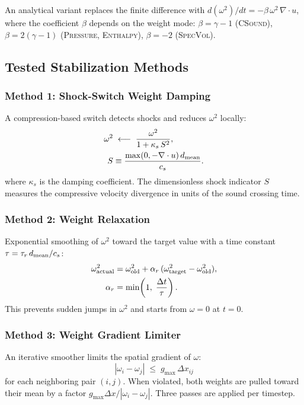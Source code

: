 \documentclass[twocolumn]{aastex63}
\newcommand{\vel}{{u}}
\begin{document}
An analytical variant replaces the finite difference with
$d(\omega^2)/dt = -\beta\,\omega^2\,\nabla\cdot\vel$, where the
coefficient $\beta$ depends on the weight mode:
$\beta = \gamma-1$ (\textsc{CSound}),
$\beta = 2(\gamma-1)$ (\textsc{Pressure}, \textsc{Enthalpy}),
$\beta = -2$ (\textsc{SpecVol}).

\subsection{Tested Stabilization Methods}

\subsubsection{Method 1: Shock-Switch Weight Damping}
A compression-based switch detects shocks and reduces $\omega^2$
locally:
\begin{equation}
  \begin{aligned}
  \omega^2 &\;\longleftarrow\; \frac{\omega^2}{1 + \kappa_s\, S^2},\\
  S &\equiv \frac{\max(0,-\nabla\cdot\vel)\,d_{\rm mean}}{c_s}.
  \end{aligned}
\end{equation}
where $\kappa_s$ is the damping coefficient.  The dimensionless
shock indicator $S$ measures the compressive velocity divergence
in units of the sound crossing time.

\subsubsection{Method 2: Weight Relaxation}
Exponential smoothing of $\omega^2$ toward the target value
with a time constant $\tau = \tau_r\, d_{\rm mean}/c_s$:
\begin{equation}
  \begin{aligned}
  \omega^{2}_{\rm actual} &= \omega^{2}_{\rm old}
    + \alpha_r\,(\omega^{2}_{\rm target} - \omega^{2}_{\rm old}),\\
  \alpha_r &= \min\!\left(1,\;\frac{\Delta t}{\tau}\right).
  \end{aligned}
\end{equation}
This prevents sudden jumps in $\omega^2$ and starts from
$\omega=0$ at $t=0$.

\subsubsection{Method 3: Weight Gradient Limiter}
An iterative smoother limits the spatial gradient of $\omega$:
\begin{equation}
  \left|\omega_i - \omega_j\right| \;\le\; g_{\max}\,\Delta x_{ij}
\end{equation}
for each neighboring pair $(i,j)$.  When violated, both weights are
pulled toward their mean by a factor $g_{\max}\Delta x / |\omega_i-\omega_j|$.
Three passes are applied per timestep.
\end{document}
